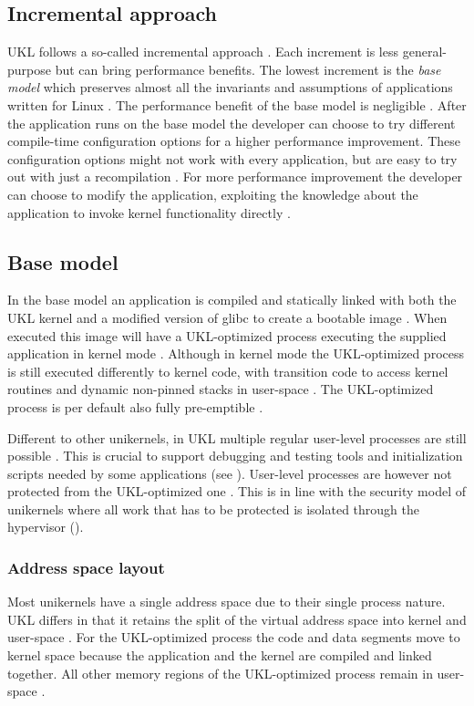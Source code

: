 \documentclass[10pt,twocolumn,a4paper]{article}
\begin{document}
  \subsection{Incremental approach}
    UKL follows a so-called incremental approach \cite{raza23}. 
    Each increment is less general-purpose but can bring performance benefits.
    The lowest increment is the \textit{base model} which preserves almost all the 
    invariants and assumptions of applications written for Linux \cite{raza23}.
    The performance benefit of the base model is negligible \cite{raza23}.
    After the application runs on the base model the developer can choose to try different
    compile-time configuration options for a higher performance improvement.
    These configuration options might not work with every application, but are easy to try out
    with just a recompilation \cite{raza23}.
    For more performance improvement the developer can choose to modify the application, exploiting the
    knowledge about the application to invoke kernel functionality directly \cite{raza23}.

  \subsection{Base model}\label{sec:base-model}
    In the base model an application is compiled and statically linked with both 
    the UKL kernel and a modified version of glibc to create a bootable image \cite{raza23}.
    When executed this image will have a UKL-optimized process executing the supplied 
    application in kernel mode \cite{raza23}.
    Although in kernel mode the UKL-optimized process is still executed differently to kernel code,
    with transition code to access kernel routines and dynamic non-pinned stacks in user-space \cite{raza23}.
    The UKL-optimized process is per default also fully pre-emptible \cite{raza23}.

    Different to other unikernels, in UKL multiple regular user-level processes are still possible \cite{raza23}.
    This is crucial to support debugging and testing tools and initialization scripts needed by
    some applications (see ).
    User-level processes are however not protected from the UKL-optimized one \cite{raza23}.
    This is in line with the security model of unikernels where all work that has to 
    be protected is isolated through the hypervisor ().

    \subsubsection{Address space layout}
      Most unikernels have a single address space due to their single process nature.
      UKL differs in that it retains the split of the virtual address space into kernel 
      and user-space \cite{raza23}.
      For the UKL-optimized process the code and data segments move to kernel space because
      the application and the kernel are compiled and linked together.
      All other memory regions of the UKL-optimized process remain in user-space \cite{raza23}.
\end{document}
